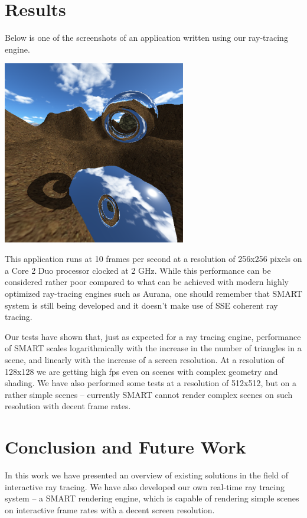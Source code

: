 \documentclass{article}
\begin{document}
\section{Results}
Below is one of the screenshots of an application written using our ray-tracing engine.
\begin{center}
\includegraphics[width=80mm]{Screenshot.png}
\end{center}
This application runs at 10 frames per second at a resolution of 256x256 pixels on a Core 2 Duo processor clocked at 2 GHz. While this performance can be considered rather poor compared to what can be achieved with modern highly optimized ray-tracing engines such as Aurana, one should remember that SMART system is still being developed and it doesn't make use of SSE coherent ray tracing.

Our tests have shown that, just as expected for a ray tracing engine, performance of SMART scales logarithmically with the increase in the number of triangles in a scene, and linearly with the increase of a screen resolution. At a resolution of 128x128 we are getting high fps even on scenes with complex geometry and shading. We have also performed some tests at a resolution of 512x512, but on a rather simple scenes -- currently SMART cannot render complex scenes on such resolution with decent frame rates. 

\newpage
\section{Conclusion and Future Work}
In this work we have presented an overview of existing solutions in the field of interactive ray tracing. We have also developed our own real-time ray tracing system -- a SMART rendering engine, which is capable of rendering simple scenes on interactive frame rates with a decent screen resolution.
\end{document}
